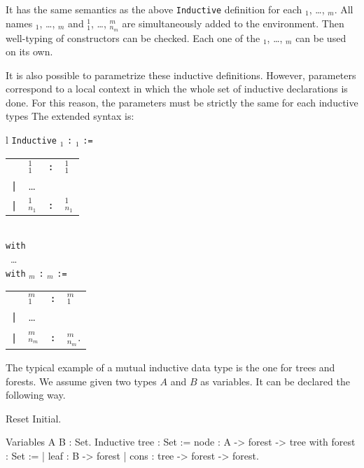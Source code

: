 \noindent It has the same semantics as the above {\tt Inductive}
definition for each \ident$_1$, {\ldots}, \ident$_m$. All names
\ident$_1$, {\ldots}, \ident$_m$ and \ident$_1^1$, \dots,
\ident$_{n_m}^m$ are simultaneously added to the environment. Then
well-typing of constructors can be checked. Each one of the
\ident$_1$, {\ldots}, \ident$_m$ can be used on its own.

It is also possible to parametrize these inductive definitions.
However, parameters correspond to a local
context in which the whole set of inductive declarations is done.  For
this reason, the parameters must be strictly the same for each
inductive types The extended syntax is:

\medskip
\begin{tabular}{l}
{\tt Inductive} {\ident$_1$} {\params} {\tt :} {\type$_1$} {\tt :=}  \\
\begin{tabular}{clcl}
         & {\ident$_1^1$}    &{\tt :}& {\type$_1^1$} \\
 {\tt |} & {\ldots} && \\
 {\tt |} & {\ident$_{n_1}^1$} &{\tt :}& {\type$_{n_1}^1$}
\end{tabular}  \\
{\tt with}\\
~{\ldots} \\
{\tt with} {\ident$_m$} {\params} {\tt :} {\type$_m$} {\tt :=} \\
\begin{tabular}{clcl}
         & {\ident$_1^m$}    &{\tt :}& {\type$_1^m$} \\
 {\tt |} & {\ldots} \\
 {\tt |} & {\ident$_{n_m}^m$} &{\tt :}& {\type$_{n_m}^m$}.
\end{tabular}
\end{tabular}
\medskip

\Example
The typical example of a mutual inductive data type is the one for
trees and forests. We assume given two types $A$ and $B$ as variables.
It can be declared the following way.

\begin{coq_eval}
Reset Initial.
\end{coq_eval}
\begin{coq_example*}
Variables A B : Set.
Inductive tree : Set :=
    node : A -> forest -> tree
with forest : Set :=
  | leaf : B -> forest
  | cons : tree -> forest -> forest.
\end{coq_example*}


